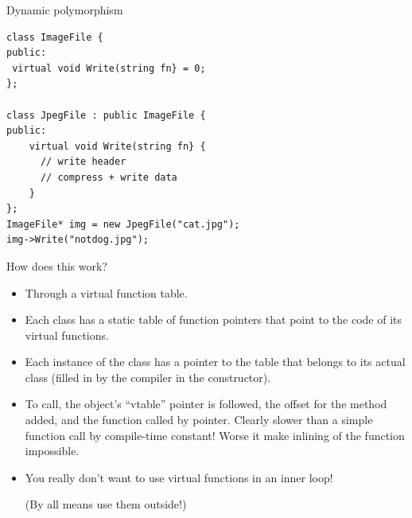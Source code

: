 \documentclass[presentation,t]{beamer}
\begin{document}
\begin{frame}[fragile]{Dynamic polymorphism}
\begin{lstlisting}
class ImageFile {
public:
 virtual void Write(string fn} = 0;
};

class JpegFile : public ImageFile {
public:
    virtual void Write(string fn} {
      // write header
      // compress + write data
    }
};
ImageFile* img = new JpegFile("cat.jpg");
img->Write("notdog.jpg");
\end{lstlisting}
\end{frame}

\begin{frame}{How does this work?}
  \begin{itemize}
  \item Through a virtual function table.

  \item Each class has a static table of function pointers that point
    to the code of its virtual functions.

  \item Each instance of the class has a pointer to the table that
    belongs to its actual class (filled in by the compiler in the
    constructor).

  \item To call, the object's ``vtable'' pointer is followed, the
    offset for the method added, and the function called by
    pointer. Clearly slower than a simple function call by
    compile-time constant! Worse it make inlining of the function
    impossible.

  \item You really don't want to use virtual functions in an inner
    loop!

    (By all means use them outside!)
  \end{itemize}
\end{frame}
\end{document}
